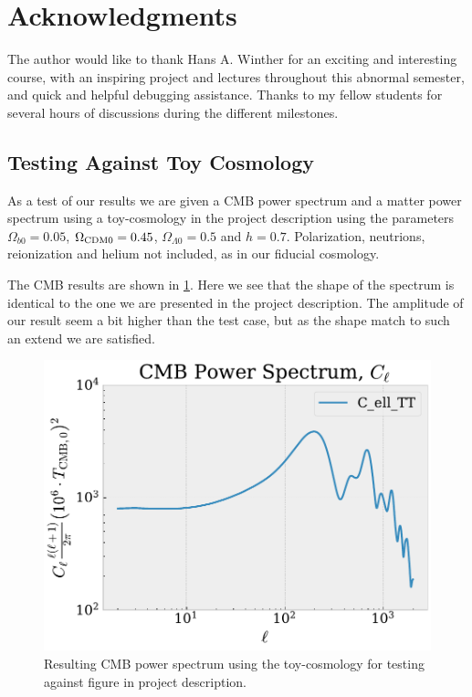 \documentclass[10pt,a4paper]{article}
\begin{document}
\section*{Acknowledgments}
The author would like to thank Hans A. Winther for an exciting and interesting course, with an inspiring project and lectures throughout this abnormal semester, and quick and helpful debugging assistance. Thanks to my fellow students for several hours of discussions during the different milestones.
\vspace{0.5cm}




\clearpage
\begin{appendices}
  \appendix
\section{Testing Against Toy Cosmology}
  \label{Asec:Testing toy}
  As a test of our results we are given a CMB power spectrum and a matter power spectrum using a toy-cosmology in the project description using the parameters $\Omega_{b0} = 0.05$, $\Omega_{\rm CDM 0} = 0.45$, $\Omega_{\Lambda 0} = 0.5$ and $h=0.7$. Polarization, neutrions, reionization and helium not included, as in our fiducial cosmology.
  
  The CMB results are shown in \cref{fig: Cell toy}. Here we see that the shape of the spectrum is identical to the one we are presented in the project description. The amplitude of our result seem a bit higher than the test case, but as the shape match to such an extend we are satisfied.
  \begin{figure}[ht!]
    \centering
    \includegraphics[scale=0.5]{../figs/Cells_toy.pdf}
    \caption{Resulting CMB power spectrum using the toy-cosmology for testing against figure in project description.}
    \label{fig: Cell toy}
  \end{figure}


\end{appendices}
\end{document}
